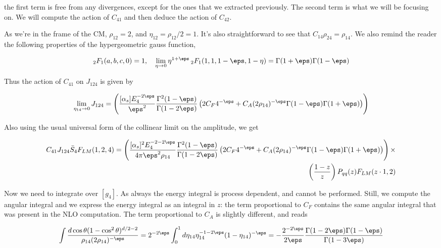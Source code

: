 \documentclass[11pt]{report}
\begin{document}
the first term is free from any divergences, except for the ones that we extracted previously. The second term is what we will be focusing on. We will compute the action of \(C_{41}\) and then deduce the action of \(C_{42}\).  

As we're in the frame of the CM, \(\rho_{12} = 2\), and \(\eta_{12} = \rho_{12}/2 = 1\). It's also straightforward to see that \(C_{14}\rho_{24} = \rho_{14}\). We also remind the reader the following properties of the hypergeometric gauss function, 

\begin{align}
    _2 F_1 (a, b, c, 0) = 1, \quad \lim_{\eta \to 0} \eta^{1+\eps} \, _2 F_1(1, 1, 1-\eps, 1-\eta) = \Gamma(1+\eps)\Gamma(1-\eps) 
\end{align}

Thus the action of \(C_{41}\) on \(J_{124}\) is given by 

\begin{align}
    \lim_{\eta_{14}\to 0} J_{124} = \left( \frac{[\alpha_s]E_4^{-2\eps}}{\eps^2}\frac{\Gamma^2(1-\eps)}{\Gamma(1-2\eps)}\left(2C_F4^{-\eps} + C_A (2\rho_{14})^{-\eps}\Gamma(1-\eps)\Gamma(1+\eps) \right) \right)
\end{align}

Also using the usual universal form of the collinear limit on the amplitude, we get 

\begin{align}
    C_{41}J_{124}\bar{S}_4 F_{LM}(1, 2, 4) = \left( \frac{[\alpha_s]^2E_4^{-2-2\eps}}{4\pi\eps^2\rho_{14}}\frac{\Gamma^2(1-\eps)}{\Gamma(1-2\eps)}\left(2C_F4^{-\eps} + C_A (2\rho_{14})^{-\eps}\Gamma(1-\eps)\Gamma(1+\eps) \right) \right) \times \\ \left( \frac{1-z}{z} \right)P_{qq}(z)F_{LM}(z\cdot 1, 2) 
\end{align}

Now we need to integrate over \([g_4]\). As always the energy integral is process dependent, and cannot be performed. Still, we compute the angular integral and we express the energy integral as an integral in \(z\): the term proportional to \(C_F\) contains the same angular integral that was present in the NLO computation. The term proportional to \(C_A\) is slightly different, and reads 

\begin{align}
    \int \frac{d\cos\theta (1-\cos^2\theta)^{d/2-2}}{\rho_{14} (2\rho_{14})^{-\eps}} = 2^{-2\eps}\int_0^1 d\eta_{14} \eta_{14}^{-1-2\eps}(1-\eta_{14})^{-\eps} = -\frac{2^{-2\eps}}{2\eps}\frac{\Gamma(1-2\eps)\Gamma(1-\eps)}{\Gamma(1-3\eps)}
\end{align}
\end{document}
